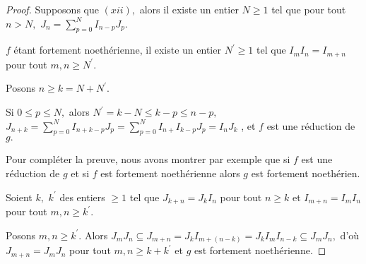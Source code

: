 \begin{proof}
	Supposons que $(xii),$ alors il existe un entier $N\geq 1$ tel que pour tout $n>N,$ $J_{n}=\sum\limits_{p=0}^{N}I_{n-p}J_{p}.$
	
	$f$ étant fortement noethérienne, il existe un entier $N^{\prime}\geq 1$ tel que $I_{m}I_{n}=I_{m+n}$ pour tout $m,n\geq N^{\prime }.$
	
	Posons $n\geq k=N+N^{\prime }.$
	
	Si $0\leq p\leq N,$ alors $N^{\prime }=k-N\leq k-p\leq n-p,$ $J_{n+k}=\sum\limits_{p=0}^{N}I_{n+k-p}J_{p}=\sum\limits_{p=0}^{N}I_{n+}I_{k-p}J_{p}=I_{n}J_{k}$ , et $f$ est une réduction de $g.$
	
	Pour compléter la preuve, nous avons montrer par exemple que si $f$ est une réduction de $g$ et si $f$ est fortement noethérienne alors $g$ est fortement noethérien.
	
	Soient $k,$ $k^{\prime }$ des entiers $\geq 1$ tel que $J_{k+n}=J_{k}I_{n}$
	pour tout $n\geq k$ et $I_{m+n}=I_{m}I_{n}$ pour tout $m,n\geq k^{\prime }.$
	
	Posons $m,n\geq k^{\prime }.$ Alors $J_{m}J_{n}\subseteq
	J_{m+n}=J_{k}I_{m+(n-k)}=J_{k}I_{m}I_{n-k}\subseteq J_{m}J_{n},$ d'où $J_{m+n}=J_{m}J_{n}$ pour tout $m,n\geq k+k^{\prime }$ et $g$ est fortement noethérienne.
\end{proof}